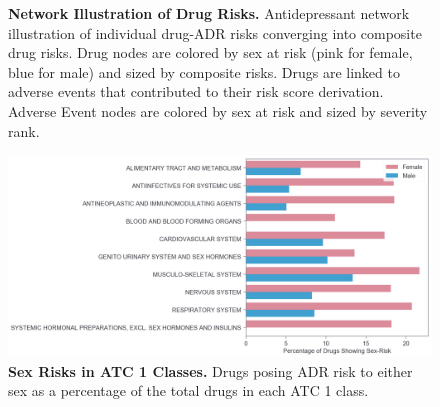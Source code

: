\documentclass[11pt, oneside]{article}
\begin{document}
\begin{figure}[H]
	\centering
	\caption{\textbf{Network Illustration of Drug Risks.} Antidepressant network illustration of individual drug-ADR risks converging into composite drug risks. Drug nodes are colored by sex at risk (pink for female, blue for male) and sized by composite risks. Drugs are linked to adverse events that contributed to their risk score derivation. Adverse Event nodes are colored by sex at risk and sized by severity rank.}
	\label{fig:network}
\end{figure}

\begin{figure}[H]
	\centering
	\includegraphics[width=\textwidth]{atc1}
	\caption{\textbf{Sex Risks in ATC 1 Classes.} Drugs posing ADR risk to either sex as a percentage of the total drugs in each ATC 1 class.}
	\label{fig:atc1}
\end{figure}
\end{document}

